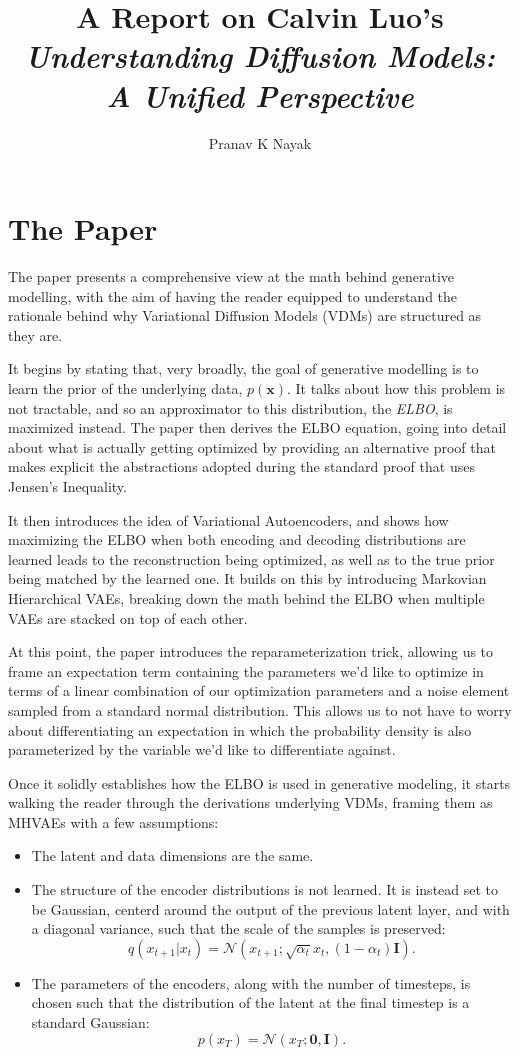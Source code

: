 \documentclass{article}
\title{A Report on Calvin Luo's \textit{Understanding Diffusion Models: A Unified Perspective}}
\author{Pranav K Nayak}
\date{}
\begin{document}
\maketitle
\section*{The Paper}  
The paper presents a comprehensive view at the math behind generative modelling, with the aim of having the reader equipped to understand the rationale behind why Variational Diffusion Models (VDMs) are structured as they are.

It begins by stating that, very broadly, the goal of generative modelling is to learn the prior of the underlying data, $p(\mathbf{x})$. It talks about how this problem is not tractable, and so an approximator to this distribution, the \textit{ELBO}, is maximized instead. The paper then derives the ELBO equation, going into detail about what is actually getting optimized by providing an alternative proof that makes explicit the abstractions adopted during the standard proof that uses Jensen's Inequality.


It then introduces the idea of Variational Autoencoders, and shows how maximizing the ELBO when both encoding and decoding distributions are learned leads to the reconstruction being optimized, as well as to the true prior being matched by the learned one. It builds on this by introducing Markovian Hierarchical VAEs, breaking down the math behind the ELBO when multiple VAEs are stacked on top of each other.

At this point, the paper introduces the reparameterization trick, allowing us to frame an expectation term containing the parameters we'd like to optimize in terms of a linear combination of our optimization parameters and a noise element sampled from a standard normal distribution. This allows us to not have to worry about differentiating an expectation in which the probability density is also parameterized by the variable we'd like to differentiate against.

Once it solidly establishes how the ELBO is used in generative modeling, it starts walking the reader through the derivations underlying VDMs, framing them as MHVAEs with a few assumptions:
\begin{itemize}
\item The latent and data dimensions are the same.
\item The structure of the encoder distributions is not learned. It is instead set to be Gaussian, centerd around the output of the previous latent layer, and with a diagonal variance, such that the scale of the samples is preserved:
  \[ 
  q(x_{t+1} | x_t) = \mathcal{N}(x_{t+1}; \sqrt{\alpha_t}x_t,(1-\alpha_t)\mathbf{I} )
  .\]
  
\item The parameters of the encoders, along with the number of timesteps, is chosen such that the distribution of the latent at the final timestep is a standard Gaussian:
  \[ 
  p(x_T) = \mathcal{N}(x_T; \mathbf{0}, \mathbf{I})
  .\]
  
\end{itemize}
\end{document}
